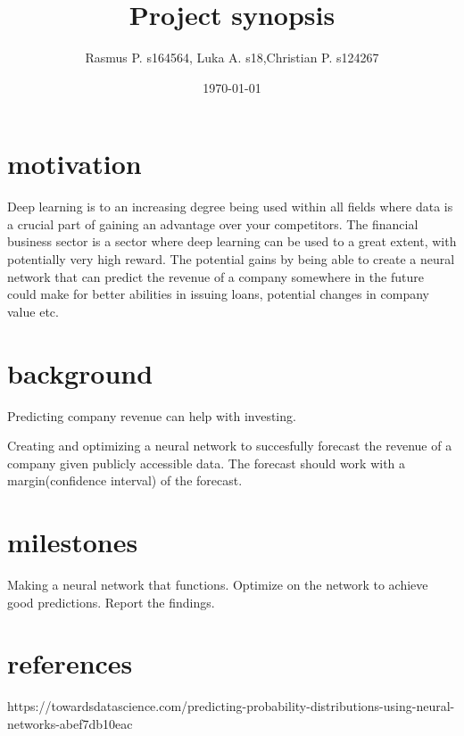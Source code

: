 \documentclass{article}
\title{Project synopsis}
\author{Rasmus P. s164564, Luka A. s18,Christian P. s124267}
\date{\today}
\begin{document}
\section*{motivation}
Deep learning is to an increasing degree being used within all fields where data is a crucial part of gaining an advantage over your competitors. The financial business sector is a sector where deep learning can be used to a great extent, with potentially very high reward. 
The potential gains by being able to create a neural network that can predict the revenue of a company somewhere in the future could make for better abilities in issuing loans, potential changes in company value etc.

\section*{background}
Predicting company revenue can help with investing.

Creating and optimizing a neural network to succesfully forecast the revenue of a company given publicly accessible data. The forecast should work with a margin(confidence interval) of the forecast.

\section*{milestones}
Making a neural network that functions.
Optimize on the network to achieve good predictions.
Report the findings.

\section*{references}
https://towardsdatascience.com/predicting-probability-distributions-using-neural-networks-abef7db10eac
\end{document}
